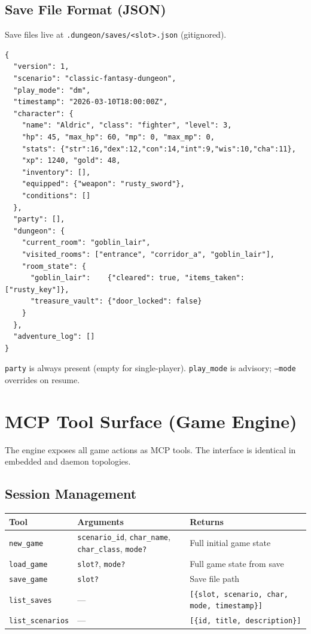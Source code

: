 \documentclass[a4paper,10pt]{article}
\newcommand{\tool}[1]{\texttt{#1}}
\newcommand{\cmd}[1]{\texttt{#1}}
\newcommand{\field}[1]{\texttt{#1}}
\begin{document}
\subsection{Save File Format (JSON)}

Save files live at \texttt{.dungeon/saves/<slot>.json} (gitignored).

\begin{lstlisting}[title={.dungeon/saves/1.json (excerpt)}]
{
  "version": 1,
  "scenario": "classic-fantasy-dungeon",
  "play_mode": "dm",
  "timestamp": "2026-03-10T18:00:00Z",
  "character": {
    "name": "Aldric", "class": "fighter", "level": 3,
    "hp": 45, "max_hp": 60, "mp": 0, "max_mp": 0,
    "stats": {"str":16,"dex":12,"con":14,"int":9,"wis":10,"cha":11},
    "xp": 1240, "gold": 48,
    "inventory": [],
    "equipped": {"weapon": "rusty_sword"},
    "conditions": []
  },
  "party": [],
  "dungeon": {
    "current_room": "goblin_lair",
    "visited_rooms": ["entrance", "corridor_a", "goblin_lair"],
    "room_state": {
      "goblin_lair":    {"cleared": true, "items_taken": ["rusty_key"]},
      "treasure_vault": {"door_locked": false}
    }
  },
  "adventure_log": []
}
\end{lstlisting}

\texttt{party} is always present (empty for single-player).
\texttt{play\_mode} is advisory; \cmd{--mode} overrides on resume.

\section{MCP Tool Surface (Game Engine)}

The engine exposes all game actions as MCP tools.  The interface is
identical in embedded and daemon topologies.

\subsection{Session Management}

\begin{center}
\begin{tabular}{lp{4cm}p{5cm}}
\toprule
\textbf{Tool} & \textbf{Arguments} & \textbf{Returns} \\
\midrule
\tool{new\_game}
  & \field{scenario\_id}, \field{char\_name}, \field{char\_class},
    \field{mode?}
  & Full initial game state \\
\tool{load\_game}
  & \field{slot?}, \field{mode?}
  & Full game state from save \\
\tool{save\_game}
  & \field{slot?}
  & Save file path \\
\tool{list\_saves}
  & ---
  & \texttt{[\{slot, scenario, char, mode, timestamp\}]} \\
\tool{list\_scenarios}
  & ---
  & \texttt{[\{id, title, description\}]} \\
\bottomrule
\end{tabular}
\end{center}
\end{document}
